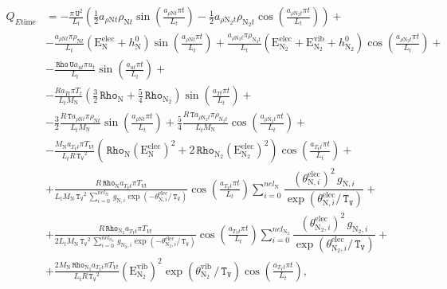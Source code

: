 \documentclass[10pt]{article}
\newcommand{\Rho}{\,\mathtt{Rho}}
\newcommand{\T}{\,\mathtt{T}}
\newcommand{\U}{\,\mathtt{U}}
\newcommand{\TV}{\,\mathtt{T_V}}
\newcommand{\N}{\text{N}}
\newcommand{\elec}{\text{elec}}
\newcommand{\vib}{\text{vib}}
\newcommand{\E}{\text{E}}
\newcommand{\convection}{\,\text{convection}}
\newcommand{\diffusion}{\,\text{diffusion}}
\newcommand{\work}{\,\text{work}}
\newcommand{\heatflux}{\,\text{heat flux}}
\newcommand{\eelecNden}{\,\sum_{i=0}^{nel_{\N}}   \, g_{\N,i}   \exp \left( -\theta^{\elec}_{\N,i} / \TV  \right) }
\newcommand{\eelecNdoisden}{\,\sum_{i=0}^{nel_{\N_2}}  \, g_{\N_2,i}   \exp \left( -\theta^{\elec}_{\N_2,i} /  \TV \right)}
\begin{document}
\begin{equation*}
\begin{split}
%
%
%
 Q_{E \text{time}} &= 
- \frac{\pi \U^{2} }{L_t}\left(\frac{1}{2} a_{ \rho \N t} \rho_{\N t} \sin\left(\frac{a_{ \rho \N t} \pi t}{L_t}\right) -
\frac{1}{2} a_{ \rho \N_2 t} \rho_{\N_2 t} \cos\left(\frac{a_{ \rho \N_2 t} \pi t}{L_t}\right)\right) +\\ 
&- \frac{ a_{ \rho \N t} \pi \rho_{\N t} }{L_t}\left(\E^{\elec}_{\N} + h^0_{\N}\right) \sin\left(\frac{a_{ \rho \N t} \pi
t}{L_t}\right) + \frac{a_{ \rho \N_2 t} \pi \rho_{\N_2 t} }{L_t}\left(\E^{\elec}_{\N_2} + \E^{\vib}_{\N_2} + h^0_{\N_2}\right)
\cos\left(\frac{a_{ \rho \N_2 t} \pi t}{L_t}\right)+\\ 
%
&- \frac{ \Rho \U a_{ut} \pi u_{t} }{L_t}\sin\left(\frac{a_{ut} \pi t}{L_t}\right) +\\ 
%
&- \frac{R a_{Tt} \pi T_{t} }{L_t M_{\N}}\left(\frac{3}{2} \Rho_{\N} + \frac{5}{4} \Rho_{\N_2}\right) \sin\left(\frac{a_{Tt} \pi
t}{L_t}\right) +\\
%
&- \frac{3}{2} \frac{R \T a_{ \rho \N t} \pi \rho_{\N t} }{L_t M_{\N}}\sin\left(\frac{a_{ \rho \N t} \pi t}{L_t}\right) +
\frac{5}{4} \frac{R \T a_{ \rho \N_2 t} \pi \rho_{\N_2 t} }{L_t M_{\N}}\cos\left(\frac{a_{ \rho \N_2 t} \pi t}{L_t}\right) +\\
%
&- \frac{M_{\N} a_{T_V t} \pi T_{Vt} }{L_t R \TV^{2}}\left(\Rho_{\N} \left( \E^{\elec}_{\N} \right)^2 + 2 \Rho_{\N_2} \left(
\E^{\elec}_{\N_2} \right)^2 \right) \cos\left(\frac{a_{T_V t} \pi t}{L_t}\right) +\\
%
& + \frac{R \Rho_{\N} a_{T_V t} \pi T_{Vt} }{L_t M_{\N} \TV^{2} \eelecNden}\cos\left(\frac{a_{T_V t} \pi t}{L_t}\right)
\sum_{i=0}^{nel_{\N}} \dfrac{ \left( \theta^{\elec}_{\N,i} \right)^2   \, g_{\N,i} }{ \exp \left( \theta^{\elec}_{\N,i} / \TV
\right)}+\\
%
& + \frac{R \Rho_{\N_2} a_{T_V t} \pi T_{Vt}}{2 L_t M_{\N}\TV^{2} \eelecNdoisden }\cos\left(\frac{a_{T_V t} \pi t}{L_t}\right)
\sum_{i=0}^{nel_{\N_2}} \dfrac{ \left( \theta^{\elec}_{\N_2,i} \right)^2   \, g_{\N_2,i} }{ \exp \left( \theta^{\elec}_{\N_2,i} / 
\TV \right)} +\\
%
& + \frac{2 M_{\N} \Rho_{\N_2} a_{T_V t} \pi T_{Vt} }{L_t R \TV^{2}} \left( \E^{\vib}_{\N_2} \right)^2 \exp\left(
\theta^{\vib}_{\N_2} \, / \TV \right) \cos\left(\frac{a_{T_V t} \pi t}{L_t}\right),\\
%
\end{split}
\end{equation*}
\end{document}
